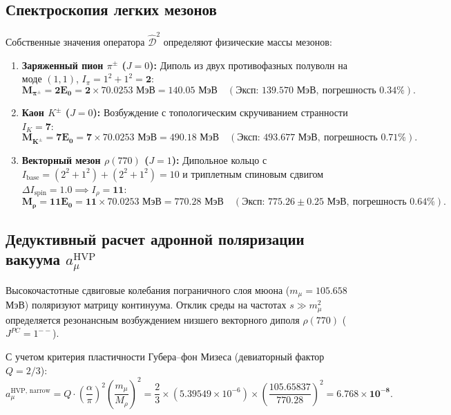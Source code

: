 \documentclass[12pt,a4paper]{article}
\begin{document}
	\subsection{Спектроскопия легких мезонов}
	Собственные значения оператора $\hat{\mathcal{D}}^2$ определяют физические массы мезонов:
	\begin{enumerate}
		\item \textbf{Заряженный пион $\pi^\pm$ ($J=0$):} Диполь из двух противофазных полуволн на моде $(1,1)$, $I_\pi = 1^2 + 1^2 = \mathbf{2}$:
		\begin{equation}
			\mathbf{M_{\pi^\pm} = 2 E_0 = 2 \times 70.0253 \text{ МэВ} = \mathbf{140.05 \text{ МэВ}}} \quad (\text{Эксп: } 139.570 \text{ МэВ}, \ \text{погрешность } 0.34\%).
		\end{equation}
		
		\item \textbf{Каон $K^\pm$ ($J=0$):} Возбуждение с топологическим скручиванием странности $I_K = \mathbf{7}$:
		\begin{equation}
			\mathbf{M_{K^\pm} = 7 E_0 = 7 \times 70.0253 \text{ МэВ} = \mathbf{490.18 \text{ МэВ}}} \quad (\text{Эксп: } 493.677 \text{ МэВ}, \ \text{погрешность } 0.71\%).
		\end{equation}
		
		\item \textbf{Векторный мезон $\rho(770)$ ($J=1$):} Дипольное кольцо с $I_{\text{base}} = (2^2+1^2) + (2^2+1^2) = 10$ и триплетным спиновым сдвигом $\Delta I_{\text{spin}} = 1.0 \implies I_\rho = \mathbf{11}$:
		\begin{equation}
			\mathbf{M_\rho = 11 E_0 = 11 \times 70.0253 \text{ МэВ} = \mathbf{770.28 \text{ МэВ}}} \quad (\text{Эксп: } 775.26 \pm 0.25 \text{ МэВ}, \ \text{погрешность } 0.64\%).
		\end{equation}
	\end{enumerate}
	
	\subsection{Дедуктивный расчет адронной поляризации вакуума $a_\mu^{\text{HVP}}$}
	Высокочастотные сдвиговые колебания пограничного слоя мюона ($m_\mu = 105.658$ МэВ) поляризуют матрицу континуума. Отклик среды на частотах $s \gg m_\mu^2$ определяется резонансным возбуждением низшего векторного диполя $\rho(770)$ ($J^{PC} = 1^{--}$).
	
	С учетом критерия пластичности Губера--фон Мизеса (девиаторный фактор $Q = 2/3$):
	\begin{equation}
		a_\mu^{\text{HVP, narrow}} = Q \cdot \left(\frac{\alpha}{\pi}\right)^2 \left(\frac{m_\mu}{M_\rho}\right)^2 = \frac{2}{3} \times (5.39549 \times 10^{-6}) \times \left(\frac{105.65837}{770.28}\right)^2 = \mathbf{6.768 \times 10^{-8}}.
	\end{equation}
	
\end{document}
